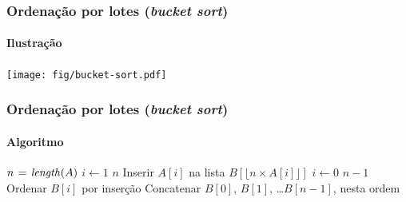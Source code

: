 \documentclass{beamer}
\begin{document}
\begin{frame}
\frametitle{Ordenação por lotes (\textit{bucket sort\/})}
\framesubtitle{Ilustração}

\begin{center}
  \texttt{[image: fig/bucket-sort.pdf]}
\end{center}

\end{frame}

\begin{frame}
\frametitle{Ordenação por lotes (\textit{bucket sort\/})}
\framesubtitle{Algoritmo}

  \begin{codebox}
    \li $n \gets \id{length}(A)$
    \li \For $i \gets 1$ \To $n$
    \li \Do Inserir $A[i]$ na lista $B[ \lfloor n \times A[i] \rfloor ]$
    \End
    \li \For $i \gets 0$ \To $n-1$
    \li \Do Ordenar $B[i]$ por inserção
    \End
    \li Concatenar $B[0]$, $B[1]$, \ldots $B[n-1]$, nesta ordem
  \end{codebox}

\end{frame}
\end{document}
